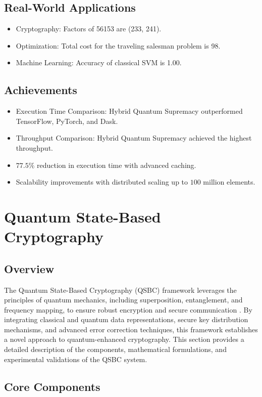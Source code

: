 \documentclass{article}
\theoremstyle{plain}
\begin{document}
\subsection{Real-World Applications}
\begin{itemize}
    \item Cryptography: Factors of 56153 are (233, 241).
    \item Optimization: Total cost for the traveling salesman problem is 98.
    \item Machine Learning: Accuracy of classical SVM is 1.00.
\end{itemize}
\subsection{Achievements}
\begin{itemize}
    \item Execution Time Comparison: Hybrid Quantum Supremacy outperformed TensorFlow, PyTorch, and Dask.
    \item Throughput Comparison: Hybrid Quantum Supremacy achieved the highest throughput.
    \item $77.5\%$ reduction in execution time with advanced caching.
    \item Scalability improvements with distributed scaling up to $100$ million elements.
\end{itemize}

\section{Quantum State-Based Cryptography}

\subsection{Overview}
The Quantum State-Based Cryptography (QSBC) framework leverages the principles of quantum mechanics, including superposition, entanglement, and frequency mapping, to ensure robust encryption and secure communication \cite{feynman1982quantum, deutsch1985quantum}. By integrating classical and quantum data representations, secure key distribution mechanisms, and advanced error correction techniques, this framework establishes a novel approach to quantum-enhanced cryptography. This section provides a detailed description of the components, mathematical formulations, and experimental validations of the QSBC system.

\subsection{Core Components}
\end{document}
